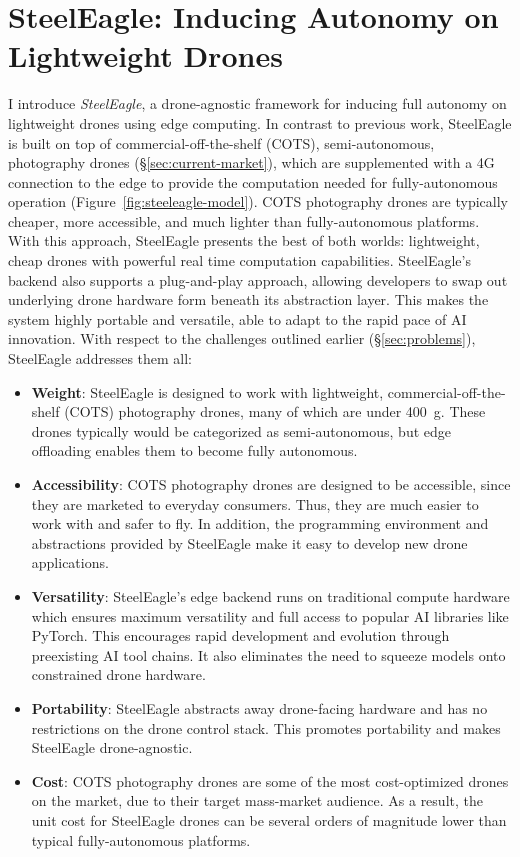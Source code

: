 \section{SteelEagle: Inducing Autonomy on Lightweight Drones}
\label{sec:se-intro}
I introduce \textit{SteelEagle}, a drone-agnostic framework for inducing full autonomy on lightweight drones using edge computing. In contrast to previous work, SteelEagle is built on top of commercial-off-the-shelf (COTS), semi-autonomous, photography drones (\S\ref{sec:current-market}), which are supplemented with a 4G~\cite{ETSI} connection to the edge to provide the computation needed for fully-autonomous operation (Figure~\ref{fig:steeleagle-model}). COTS photography drones are typically cheaper, more accessible, and much lighter than fully-autonomous platforms. With this approach, SteelEagle presents the best of both worlds: lightweight, cheap drones with powerful real time computation capabilities. SteelEagle's backend also supports a plug-and-play approach, allowing developers to swap out underlying drone hardware form beneath its abstraction layer. This makes the system highly portable and versatile, able to adapt to the rapid pace of AI innovation. With respect to the challenges outlined earlier (\S\ref{sec:problems}), SteelEagle addresses them all:

\begin{itemize}
    \item \textbf{Weight}: SteelEagle is designed to work with lightweight, commercial-off-the-shelf (COTS) photography drones, many of which are under 400~g. These drones typically would be categorized as semi-autonomous, but edge offloading enables them to become fully autonomous.
    \item \textbf{Accessibility}: COTS photography drones are designed to be accessible, since they are marketed to everyday consumers. Thus, they are much easier to work with and safer to fly. In addition, the programming environment and abstractions provided by SteelEagle make it easy to develop new drone applications.
    \item \textbf{Versatility}: SteelEagle's edge backend runs on traditional compute hardware which ensures maximum versatility and full access to popular AI libraries like PyTorch. This encourages rapid development and evolution through preexisting AI tool chains. It also eliminates the  need to squeeze models onto constrained drone hardware.
    \item \textbf{Portability}: SteelEagle abstracts away drone-facing hardware and has no restrictions on the drone control stack. This promotes portability and makes SteelEagle drone-agnostic.
    \item \textbf{Cost}: COTS photography drones are some of the most cost-optimized drones on the market, due to their target mass-market audience. As a result, the unit cost for SteelEagle drones can be several orders of magnitude lower than typical fully-autonomous platforms.
\end{itemize}

